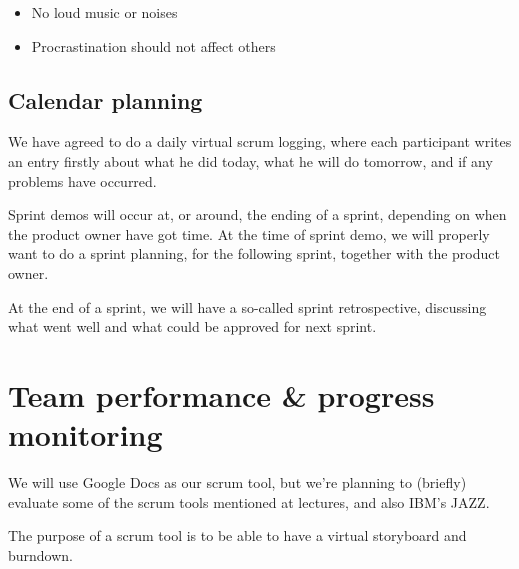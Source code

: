 \documentclass[a4paper,11pt]{article}
\begin{document}
\begin{itemize}
	\item No loud music or noises

	\item Procrastination should not affect others
\end{itemize}

\subsection{Calendar planning} %
\label{subsec:calendar_planning}

We have agreed to do a daily virtual scrum logging, where each participant writes an entry firstly about what he did today, what he will do tomorrow, and if any problems have occurred.

Sprint demos will occur at, or around, the ending of a sprint, depending on when the product owner have got time.
At the time of sprint demo, we will properly want to do a sprint planning, for the following sprint, together with the product owner.

At the end of a sprint, we will have a so-called sprint retrospective, discussing what went well and what could be approved for next sprint.



\section{Team performance \& progress monitoring} %
\label{sec:team_performance_progress_monitoring}
We will use Google Docs as our scrum tool, but we're planning to (briefly) evaluate some of the scrum tools mentioned at lectures, and also IBM's JAZZ.

The purpose of a scrum tool is to be able to have a virtual storyboard and burndown.
\end{document}
